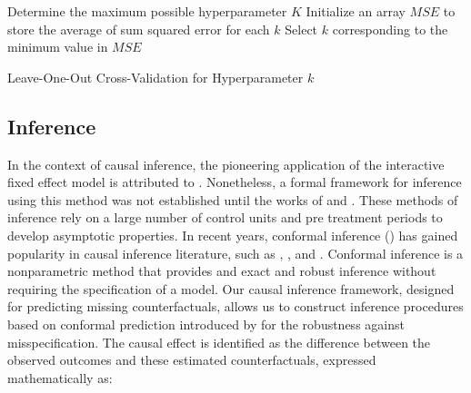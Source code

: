 \documentclass[12pt]{article}
\begin{document}
\begin{algorithm}[!ht]
    \SetAlgoLined
    Determine the maximum possible hyperparameter $K$\;
    Initialize an array $MSE$ to store the average of sum squared error for each $k$\;
      Select $k$ corresponding to the minimum value in $MSE$\;
    \caption{Leave-One-Out Cross-Validation for Hyperparameter $k$}
    \label{algorithm: 2}
\end{algorithm}

\subsection{Inference}

In the context of causal inference, the pioneering application of the interactive fixed effect model is attributed to \cite{hsiao2012panel}. Nonetheless, a formal framework for inference using this method was not established until the works of \cite{chan2016policy} and \cite{li2018inference}. These methods of inference rely on a large number of control units and pre treatment periods to develop asymptotic properties. In recent years, conformal inference (\cite{chernozhukov2021exact}) has gained popularity in causal inference literature, such as \cite{ben2021augmented}, \cite{roth2023s}, and \cite{imbens2024causal}. Conformal inference is a nonparametric method that provides and exact and robust inference without requiring the specification of a model. Our causal inference framework, designed for predicting missing counterfactuals, allows us to construct inference procedures based on conformal prediction introduced by \cite{shafer2008tutorial} for the robustness against misspecification. The causal effect is identified as the difference between the observed outcomes and these estimated counterfactuals, expressed mathematically as:
\end{document}
